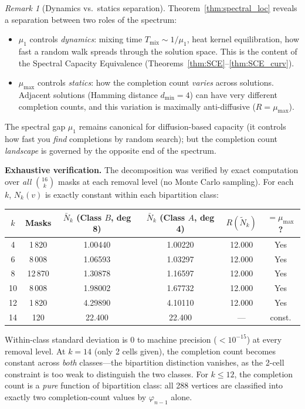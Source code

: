 \documentclass[11pt]{article}
\theoremstyle{definition}
\theoremstyle{remark}
\newtheorem{remark}[theorem]{Remark}
\begin{document}
\begin{remark}[Dynamics vs.\ statics separation]\label{rem:separation}
Theorem~\ref{thm:spectral_loc} reveals a separation between two roles of the spectrum:
\begin{itemize}[nosep]
\item $\mu_1$ controls \emph{dynamics}: mixing time $T_{\mathrm{mix}} \sim 1/\mu_1$, heat kernel equilibration, how fast a random walk spreads through the solution space. This is the content of the Spectral Capacity Equivalence (Theorems~\ref{thm:SCE}--\ref{thm:SCE_curv}).
\item $\mu_{\max}$ controls \emph{statics}: how the completion count \emph{varies} across solutions. Adjacent solutions (Hamming distance $d_{\min} = 4$) can have very different completion counts, and this variation is maximally anti-diffusive ($R = \mu_{\max}$).
\end{itemize}
The spectral gap $\mu_1$ remains canonical for diffusion-based capacity (it controls how fast you \emph{find} completions by random search); but the completion count \emph{landscape} is governed by the opposite end of the spectrum.
\end{remark}

\textbf{Exhaustive verification.} The decomposition was verified by exact computation over \emph{all} $\binom{16}{k}$ masks at each removal level (no Monte Carlo sampling). For each $k$, $N_k(v)$ is exactly constant within each bipartition class:

\begin{center}
\begin{tabular}{cccccc}
\toprule
$k$ & Masks & $\bar{N}_k$ (Class $B$, deg 8) & $\bar{N}_k$ (Class $A$, deg 4) & $R(\tilde{N}_k)$ & $= \mu_{\max}$? \\
\midrule
4  & 1\,820 & 1.00440 & 1.00220 & 12.000 & Yes \\
6  & 8\,008 & 1.06593 & 1.03297 & 12.000 & Yes \\
8  & 12\,870 & 1.30878 & 1.16597 & 12.000 & Yes \\
10 & 8\,008 & 1.98002 & 1.67732 & 12.000 & Yes \\
12 & 1\,820 & 4.29890 & 4.10110 & 12.000 & Yes \\
14 & 120 & 22.400 & 22.400 & --- & const. \\
\bottomrule
\end{tabular}
\end{center}

Within-class standard deviation is $0$ to machine precision ($< 10^{-15}$) at every removal level. At $k = 14$ (only 2 cells given), the completion count becomes constant across \emph{both} classes---the bipartition distinction vanishes, as the 2-cell constraint is too weak to distinguish the two classes. For $k \le 12$, the completion count is a \emph{pure} function of bipartition class: all 288 vertices are classified into exactly two completion-count values by $\varphi_{n-1}$ alone.
\end{document}
